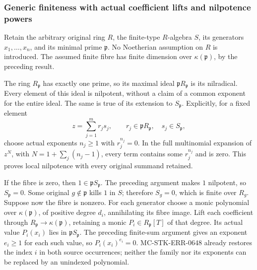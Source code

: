 \subsubsection{Generic finiteness with actual coefficient lifts and nilpotence powers}\label{algebra-proof-031-generic-finiteness-with-actual-coefficient-lifts-and-nilpotence-powers}

Retain the arbitrary original ring \(R\), the finite-type \(R\)-algebra \(S\), its generators \(x_1,\ldots,x_n\), and its minimal prime \(\mathfrak p\). No Noetherian assumption on \(R\) is introduced. The assumed finite fibre has finite dimension over \(\kappa(\mathfrak p)\), by the preceding result.

The ring \(R_{\mathfrak p}\) has exactly one prime, so its maximal ideal \(\mathfrak pR_{\mathfrak p}\) is its nilradical. Every element of this ideal is nilpotent, without a claim of a common exponent for the entire ideal. The same is true of its extension to \(S_{\mathfrak p}\). Explicitly, for a fixed element \[
 z=\sum_{j=1}^m r_js_j,\qquad
 r_j\in\mathfrak pR_{\mathfrak p},\quad s_j\in S_{\mathfrak p},
\] choose actual exponents \(n_j\ge1\) with \(r_j^{n_j}=0\). In the full multinomial expansion of \(z^N\), with \(N=1+\sum_j(n_j-1)\), every term contains some \(r_j^{n_j}\) and is zero. This proves local nilpotence with every original summand retained.

If the fibre is zero, then \(1\in\mathfrak pS_{\mathfrak p}\). The preceding argument makes \(1\) nilpotent, so \(S_{\mathfrak p}=0\). Some original \(g\notin\mathfrak p\) kills \(1\) in \(S\); therefore \(S_g=0\), which is finite over \(R_g\). Suppose now the fibre is nonzero. For each generator choose a monic polynomial over \(\kappa(\mathfrak p)\), of positive degree \(d_i\), annihilating its fibre image. Lift each coefficient through \(R_{\mathfrak p}\to\kappa(\mathfrak p)\), retaining a monic \(P_i\in R_{\mathfrak p}[T]\) of that degree. Its actual value \(P_i(x_i)\) lies in \(\mathfrak pS_{\mathfrak p}\). The preceding finite-sum argument gives an exponent \(e_i\ge1\) for each such value, so \(P_i(x_i)^{e_i}=0\). MC-STK-ERR-0648 already restores the index \(i\) in both source occurrences; neither the family nor its exponents can be replaced by an unindexed polynomial.

